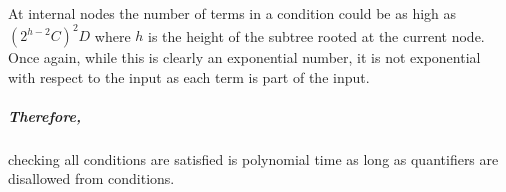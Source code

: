 At internal nodes the number of terms in a condition could be as high as
$(2^{h-2}C)^2 D$ where $h$ is the height of the subtree rooted at the
current node. Once again, while this is clearly an exponential number,
it is not exponential with respect to the input as each term is part of
the input.

\subparagraph{Therefore,}

checking all conditions are satisfied is polynomial time as long as
quantifiers are disallowed from conditions.

